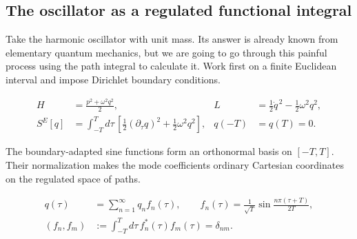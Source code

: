 \subsection{The oscillator as a regulated functional integral}

Take the harmonic oscillator with unit mass.  Its answer is already known from
elementary quantum mechanics, but we are going to go through this painful
process using the path integral to calculate it.  Work first on a finite
Euclidean interval and impose Dirichlet boundary conditions.

\begin{align}
  H&=\frac{p^2+\omega^2q^2}{2},
  &L&=\frac12\dot q^{\,2}-\frac12\omega^2q^2,
  \label{eq:proposal-oscillator-lorentzian}\\
  S^E[q]&=\int_{-T}^{T}d\tau\,
  \left[\frac12(\partial_\tau q)^2+\frac12\omega^2q^2\right],
  &q(-T)&=q(T)=0.
  \label{eq:proposal-oscillator-euclidean}
\end{align}

The boundary-adapted sine functions form an orthonormal basis on $[-T,T]$.
Their normalization makes the mode coefficients ordinary Cartesian
coordinates on the regulated space of paths.

\begin{align}
  q(\tau)&=\sum_{n=1}^{\infty}q_nf_n(\tau),
  \qquad
  f_n(\tau)=\frac1{\sqrt T}
  \sin\frac{n\pi(\tau+T)}{2T},
  \label{eq:proposal-dirichlet-modes}\\
  (f_n,f_m)&:=\int_{-T}^{T}d\tau\,
  f_n^*(\tau)f_m(\tau)=\delta_{nm}.
  \label{eq:proposal-dirichlet-orthonormality}
\end{align}

